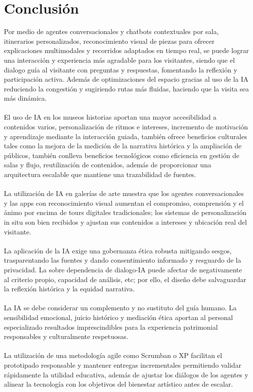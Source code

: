 \documentclass[pdflatex,sn-mathphys-num]{sn-jnl}%
\theoremstyle{thmstyleone}%
\theoremstyle{thmstyletwo}%
\theoremstyle{thmstylethree}%
\begin{document}
\section{Conclusión}\label{sec13}

Por medio de agentes conversacionales y chatbots contextuales por sala, itinerarios personalizados, reconocimiento visual de piezas para ofrecer explicaciones multimodales y recorridos adaptados en tiempo real, se puede lograr una interacción y experiencia más agradable para los visitantes, siendo que el dialogo guía al visitante con preguntas y respuestas, fomentando la reflexión y participación activa. Además de optimizaciones del espacio gracias al uso de la IA reduciendo la congestión y sugiriendo rutas más fluidas, haciendo que la visita sea más dinámica.
\mbox{} \\ \\
El uso de IA en los museos historias aportan una mayor accesibilidad a contenidos varios, personalización de ritmos e intereses, incremento de motivación y aprendizaje mediante la interacción guiada, también ofrece beneficios culturales tales como la mejora de la medición de la narrativa histórica y la ampliación de públicos, también conlleva beneficios tecnológicos como eficiencia en gestión de salas y flujo, reutilización de contenidos, además de proporcionar una arquitectura escalable que mantiene una trazabilidad de fuentes.
\mbox{} \\ \\
La utilización de IA en galerías de arte muestra que los agentes conversacionales y las apps con reconocimiento visual aumentan el compromiso, comprensión y el ánimo por encima de tours digitales tradicionales; los sistemas de personalización in situ son bien recibidos y ajustan sus contenidos a intereses y ubicación real del visitante.
\mbox{} \\ \\
La aplicación de la IA exige una gobernanza ética robusta mitigando sesgos, trasparentando las fuentes y dando consentimiento informado y resguardo de la privacidad. La sobre dependencia de dialogo-IA puede afectar de negativamente al criterio propio, capacidad de análisis, etc; por ello, el diseño debe salvaguardar la reflexión histórica y la equidad narrativa.
\mbox{} \\ \\
La IA se debe considerar un complemento y no sustituto del guía humano. La sensibilidad emocional, juicio histórico y mediación ética aportan al personal especializado resultados imprescindibles para la experiencia patrimonial responsables y culturalmente respetuosas. 
\mbox{} \\ \\
La utilización de una metodología agile como Scrumban o XP facilitan el prototipado responsable y mantener entregas incrementales permitiendo validar rápidamente la utilidad educativa, además de ajustar los diálogos de los agentes y alinear la tecnología con los objetivos del bienestar artístico antes de escalar.
\end{document}
